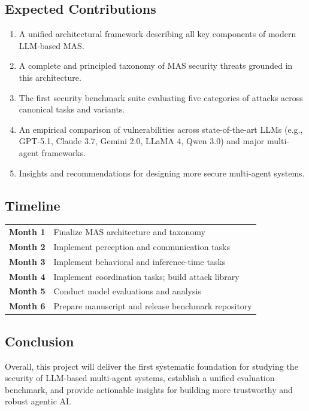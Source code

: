 \subsection{Expected Contributions}

\begin{enumerate}
    \item A unified architectural framework describing all key components of modern LLM-based MAS.
    \item A complete and principled taxonomy of MAS security threats grounded in this architecture.
    \item The first security benchmark suite evaluating five categories of attacks across canonical tasks and variants.
    \item An empirical comparison of vulnerabilities across state-of-the-art LLMs (e.g., GPT-5.1, Claude 3.7, Gemini 2.0, LLaMA 4, Qwen 3.0) and major multi-agent frameworks.
    \item Insights and recommendations for designing more secure multi-agent systems.
\end{enumerate}

\subsection{Timeline}

\begin{tabular}{ll}
\textbf{Month 1} & Finalize MAS architecture and taxonomy \\
\textbf{Month 2} & Implement perception and communication tasks \\
\textbf{Month 3} & Implement behavioral and inference-time tasks \\
\textbf{Month 4} & Implement coordination tasks; build attack library \\
\textbf{Month 5} & Conduct model evaluations and analysis \\
\textbf{Month 6} & Prepare manuscript and release benchmark repository
\end{tabular}

\subsection{Conclusion}

Overall, this project will deliver the first systematic foundation for studying the security of LLM-based multi-agent systems, establish a unified evaluation benchmark, and provide actionable insights for building more trustworthy and robust agentic AI.


